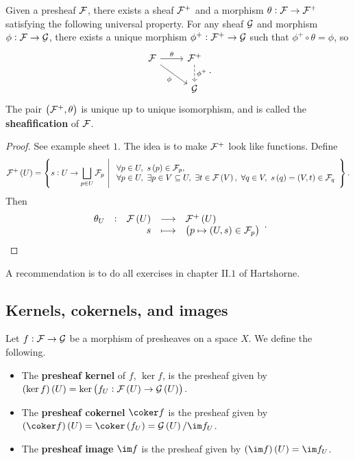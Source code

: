 \begin{theorem}[Sheafification]
Given a presheaf $ \mathcal{F} $, there exists a sheaf $ \mathcal{F}^+ $ and a morphism $ \theta : \mathcal{F} \to \mathcal{F}^+ $ satisfying the following universal property. For any sheaf $ \mathcal{G} $ and morphism $ \phi : \mathcal{F} \to \mathcal{G} $, there exists a unique morphism $ \phi^+ : \mathcal{F}^+ \to \mathcal{G} $ such that $ \phi^+ \circ \theta = \phi $, so
$$
\begin{tikzcd}
\FFF \arrow{r}{\theta} \arrow{dr}[swap]{\phi} & \FFF^+ \arrow[dashed]{d}{\phi^+} \\
& \GGG
\end{tikzcd}.
$$
The pair $ \br{\FFF^+, \theta} $ is unique up to unique isomorphism, and is called the \textbf{sheafification} of $ \mathcal{F} $.
\end{theorem}

\begin{proof}
See example sheet $ 1 $. The idea is to make $ \mathcal{F}^+ $ look like functions. Define
$$ \FFF^+\br{U} = \cbr{s : U \to \bigsqcup_{p \in U} \FFF_p \st \begin{array}{l} \forall p \in U, \ s\br{p} \in \FFF_p, \\ \forall p \in U, \ \exists p \in V \subseteq U, \ \exists t \in \FFF\br{V}, \ \forall q \in V, \ s\br{q} = \br{V, t} \in \FFF_q \end{array}}. $$
Then
$$ \function[\theta_U]{\FFF\br{U}}{\FFF^+\br{U}}{s}{\br{p \mapsto \br{U, s} \in \FFF_p}}. $$
\end{proof}

\begin{exercise*}
A recommendation is to do all exercises in chapter II.$ 1 $ of Hartshorne.
\end{exercise*}

\pagebreak

\subsection{Kernels, cokernels, and images}


\begin{definition*}
Let $ f : \mathcal{F} \to \mathcal{G} $ be a morphism of presheaves on a space $ X $. We define the following.
\begin{itemize}
\item The \textbf{presheaf kernel} of $ f $, $ \ker f $, is the presheaf given by $ \br{\ker f}\br{U} = \ker \br{f_U : \FFF\br{U} \to \GGG\br{U}} $.
\item The \textbf{presheaf cokernel} $ \coker f $ is the presheaf given by $ \br{\coker f}\br{U} = \coker \br{f_U} = \GGG\br{U} / \im f_U $.
\item The \textbf{presheaf image} $ \im f $ is the presheaf given by $ \br{\im f}\br{U} = \im f_U $.
\end{itemize}
\end{definition*}

